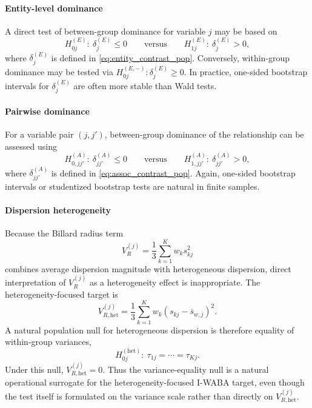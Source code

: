 \documentclass[preprint, times, 12pt, authoryear]{elsarticle}
\begin{document}
\paragraph{Entity-level dominance}
A direct test of between-group dominance for variable $j$ may be based on
\[
H_{0j}^{(E)}:\ \delta_j^{(E)}\le 0
\qquad\text{versus}\qquad
H_{1j}^{(E)}:\ \delta_j^{(E)}>0,
\]
where $\delta_j^{(E)}$ is defined in \eqref{eq:entity_contrast_pop}. Conversely, within-group dominance may be tested via $H_{0j}^{(E,-)}:\delta_j^{(E)}\ge 0$. In practice, one-sided bootstrap intervals for $\delta_j^{(E)}$ are often more stable than Wald tests.

\paragraph{Pairwise dominance}
For a variable pair $(j,j')$, between-group dominance of the relationship can be assessed using
\[
H_{0,jj'}^{(A)}:\ \delta_{jj'}^{(A)}\le 0
\qquad\text{versus}\qquad
H_{1,jj'}^{(A)}:\ \delta_{jj'}^{(A)}>0,
\]
where $\delta_{jj'}^{(A)}$ is defined in \eqref{eq:assoc_contrast_pop}. Again, one-sided bootstrap intervals or studentized bootstrap tests are natural in finite samples.

\paragraph{Dispersion heterogeneity}
Because the Billard radius term
\[
V_R^{(j)}=\frac13\sum_{k=1}^K w_k s_{kj}^2
\]
combines average dispersion magnitude with heterogeneous dispersion, direct interpretation of $V_R^{(j)}$ as a heterogeneity effect is inappropriate. The heterogeneity-focused target is
\[
V_{R,\mathrm{het}}^{(j)}=\frac13\sum_{k=1}^K w_k(s_{kj}-\bar s_{w,j})^2.
\]
A natural population null for heterogeneous dispersion is therefore equality of within-group variances,
\begin{equation}\label{eq:null_equal_var}
	H_{0j}^{(\mathrm{het})}:\ \tau_{1j}=\cdots=\tau_{Kj}.
\end{equation}
Under this null, \(V_{R,\mathrm{het}}^{(j)}=0\). Thus the variance-equality null is a natural operational surrogate for the heterogeneity-focused I-WABA target, even though the test itself is formulated on the variance scale rather than directly on \(V_{R,\mathrm{het}}^{(j)}\).
\end{document}
